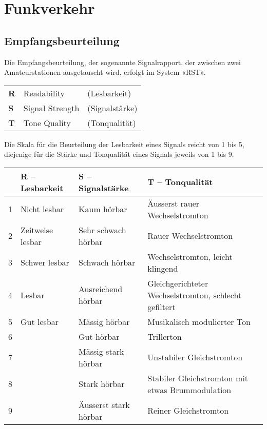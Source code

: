 \chapter{Funkverkehr}
\section{Empfangsbeurteilung}
Die Empfangsbeurteilung, der sogenannte Signalrapport, der zwischen zwei Amateurstationen aus­getauscht wird, erfolgt im System «RST».

\vspace{1em}
\begin{tabular}{lll}
\textbf{R} & Readability & (Lesbarkeit) \\
\textbf{S} & Signal Strength & (Signalstärke)\\
\textbf{T} & Tone Quality & (Tonqualität)
\end{tabular}
\vspace{1em}

Die Skala für die Beurteilung der Lesbarkeit eines Signals reicht von 1 bis 5, diejenige für die Stärke und Tonqualität eines Signals jeweils von 1 bis 9.

\vspace{1em}
\begin{tabular}{llll}
 & R – Lesbarkeit & S – Signalstärke & T – Tonqualität \\ \toprule \arrayrulecolor{rowsep}
1 & Nicht lesbar & Kaum hörbar & Äusserst rauer Wechselstromton \\ \midrule
2 & Zeitweise lesbar & Sehr schwach hörbar & Rauer Wechselstromton \\ \midrule
3 & Schwer lesbar & Schwach hörbar & Wechselstromton, leicht klingend \\ \midrule
4 & Lesbar & Ausreichend hörbar & \begin{minipage}[t]{4cm}{\raggedright Gleichgerichteter Wechsel\-strom\-ton, schlecht gefiltert}\end{minipage} \\ \midrule
5 & Gut lesbar & Mässig hörbar & Musikalisch modulierter Ton \\ \midrule
6 &  & Gut hörbar & Trillerton \\ \midrule
7 &  & Mässig stark hörbar & Unstabiler Gleichstromton \\ \midrule
8 &  & Stark hörbar & \begin{minipage}[t]{4cm}{\raggedright Stabiler Gleichstromton mit etwas Brummodulation}\end{minipage} \\ \midrule
9 &  & Äusserst stark hörbar & Reiner Gleichstromton \\ \midrule
\end{tabular}
\vspace{1em}

